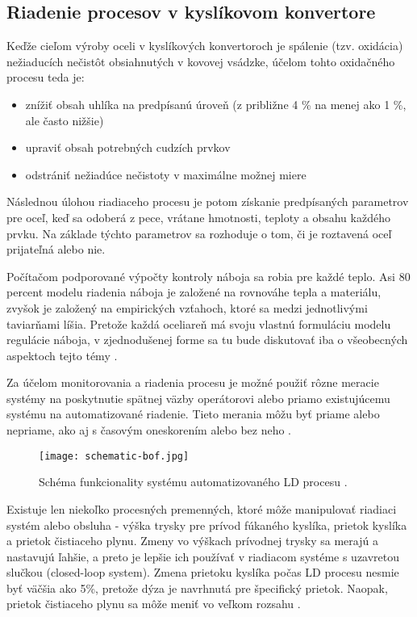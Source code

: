 \subsection{Riadenie procesov v kyslíkovom konvertore}

Keďže cieľom výroby oceli v kyslíkových konvertoroch je spálenie (tzv. oxidácia) nežiaducích nečistôt obsiahnutých v kovovej vsádzke, účelom tohto oxidačného procesu teda je:

\begin{itemize}
	\item znížiť obsah uhlíka na predpísanú úroveň (z približne 4 \% na menej ako 1 \%, ale často nižšie)
	\item upraviť obsah potrebných cudzích prvkov
	\item odstrániť nežiadúce nečistoty v maximálne možnej miere
\end{itemize}

Následnou úlohou riadiaceho procesu je potom získanie predpísaných parametrov pre oceľ, keď sa odoberá z pece, vrátane hmotnosti, teploty a obsahu každého prvku. Na základe týchto parametrov sa rozhoduje o tom, či je roztavená oceľ prijateľná alebo nie.

Počítačom podporované výpočty kontroly náboja sa robia pre každé teplo. Asi 80 percent modelu riadenia náboja je založené na rovnováhe tepla a materiálu, zvyšok je založený na empirických vzťahoch, ktoré sa medzi jednotlivými taviarňami líšia. Pretože každá oceliareň má svoju vlastnú formuláciu modelu regulácie náboja, v zjednodušenej forme sa tu bude diskutovať iba o všeobecných aspektoch tejto témy \cite{Turkdogan1996}.

Za účelom monitorovania a riadenia procesu je možné použiť rôzne meracie systémy na poskytnutie spätnej väzby operátorovi alebo priamo existujúcemu systému na automatizované riadenie. Tieto merania môžu byť priame alebo nepriame, ako aj s časovým oneskorením alebo bez neho \cite{Widlund1998}.

\begin{figure}[h!]
\centering
\texttt{[image: schematic-bof.jpg]}
\caption{Schéma funkcionality systému automatizovaného LD procesu \citep{Turkdogan1996}.}
\label{o:21}
\end{figure}

Existuje len niekoľko procesných premenných, ktoré môže manipulovať riadiaci systém alebo obsluha - výška trysky pre prívod fúkaného kyslíka, prietok kyslíka a prietok čistiaceho plynu. Zmeny vo výškach prívodnej trysky sa merajú a nastavujú ľahšie, a preto je lepšie ich používať v riadiacom systéme s uzavretou slučkou (closed-loop system). Zmena prietoku kyslíka počas LD procesu nesmie byť väčšia ako 5\%, pretože dýza je navrhnutá pre špecifický prietok. Naopak, prietok čistiaceho plynu sa môže meniť vo veľkom rozsahu \cite{Widlund1998}.